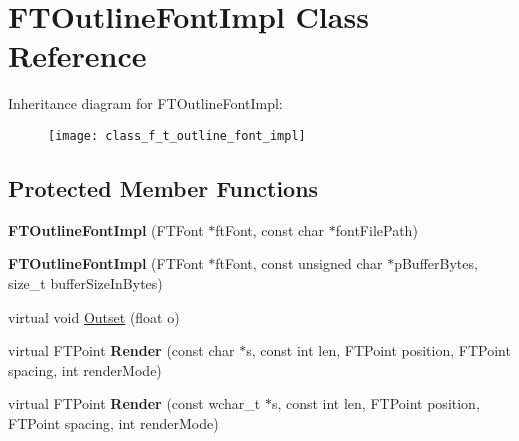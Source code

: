\hypertarget{class_f_t_outline_font_impl}{\section{F\-T\-Outline\-Font\-Impl Class Reference}
\label{class_f_t_outline_font_impl}
}
Inheritance diagram for F\-T\-Outline\-Font\-Impl\-:\begin{figure}[H]
\begin{center}
\leavevmode
\texttt{[image: class\_f\_t\_outline\_font\_impl]}
\end{center}
\end{figure}
\subsection*{Protected Member Functions}
\begin{DoxyCompactItemize}
\item 
\hypertarget{class_f_t_outline_font_impl_a01af1e37c082fce3f483361b455f9ac2}{{\bfseries F\-T\-Outline\-Font\-Impl} (F\-T\-Font $\ast$ft\-Font, const char $\ast$font\-File\-Path)}\label{class_f_t_outline_font_impl_a01af1e37c082fce3f483361b455f9ac2}

\item 
\hypertarget{class_f_t_outline_font_impl_a3b0befb0c886bbc7cb8873afbfc0a9db}{{\bfseries F\-T\-Outline\-Font\-Impl} (F\-T\-Font $\ast$ft\-Font, const unsigned char $\ast$p\-Buffer\-Bytes, size\-\_\-t buffer\-Size\-In\-Bytes)}\label{class_f_t_outline_font_impl_a3b0befb0c886bbc7cb8873afbfc0a9db}

\item 
virtual void \hyperlink{class_f_t_outline_font_impl_a22cb75a9c717403f399906d24d4aac82}{Outset} (float o)
\item 
\hypertarget{class_f_t_outline_font_impl_a10caae0ba62ba4c7d5a8742114517651}{virtual F\-T\-Point {\bfseries Render} (const char $\ast$s, const int len, F\-T\-Point position, F\-T\-Point spacing, int render\-Mode)}\label{class_f_t_outline_font_impl_a10caae0ba62ba4c7d5a8742114517651}

\item 
\hypertarget{class_f_t_outline_font_impl_aa4957e338292c7202df9bfb1362e4084}{virtual F\-T\-Point {\bfseries Render} (const wchar\-\_\-t $\ast$s, const int len, F\-T\-Point position, F\-T\-Point spacing, int render\-Mode)}\label{class_f_t_outline_font_impl_aa4957e338292c7202df9bfb1362e4084}

\end{DoxyCompactItemize}
